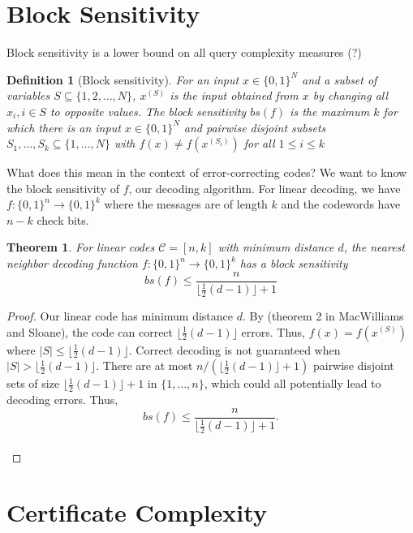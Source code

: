 \documentclass[12pt]{article}
\author{Marika Swanberg}
\newtheorem{theorem}{Theorem}
\newtheorem{definition}{Definition}
\begin{document}
\section{Block Sensitivity} 
Block sensitivity is a lower bound on all query complexity measures (?)

\begin{definition}[Block sensitivity] For an input $x\in \{0,1\}^N$ and a subset of variables $S \subseteq \{1, 2, \ldots, N\}$, $x^{(S)}$ is the input obtained from $x$ by changing all $x_i, i \in S$ to opposite values. The block sensitivity $bs(f)$ is the maximum $k$ for which there is an input $x \in \{0,1\}^N$ and pairwise disjoint subsets $S_1, \ldots, S_k \subseteq \{1, \ldots, N\}$ with $f(x) \neq f(x^{(S_i)})$ for all $1 \leq i \leq k$
\end{definition}

What does this mean in the context of error-correcting codes? We want to know the block sensitivity of $f$, our decoding algorithm. For linear decoding, we have $f: \{0,1\}^n \rightarrow \{0,1\}^k$ where the messages are of length $k$ and the codewords have $n-k$ check bits. 

\begin{theorem}
For linear codes $\mathscr{C} = [n,k]$ with minimum distance $d$, the nearest neighbor decoding function $f: \{0,1\}^n \rightarrow \{0,1\}^k$ has a block sensitivity $$
bs(f) \leq \frac{n}{\lfloor \frac{1}{2}(d-1)  \rfloor +1}$$
\end{theorem}

\begin{proof}
Our linear code has minimum distance $d$. By (theorem 2 in MacWilliams and Sloane), the code can correct $\lfloor \frac{1}{2}(d-1) \rfloor$ errors. Thus, $f(x) = f(x^{(S)})$ where $\lvert S \rvert \leq \lfloor \frac{1}{2}(d-1) \rfloor$. Correct decoding is not guaranteed when $\lvert S \rvert > \lfloor \frac{1}{2}(d-1) \rfloor$. There are at most $n/(\lfloor \frac{1}{2}(d-1) \rfloor +1)$ pairwise disjoint sets of size $\lfloor \frac{1}{2}(d-1) \rfloor+ 1$ in $\{1, \ldots, n\}$, which could all potentially lead to decoding errors. Thus, $$bs(f) \leq \frac{n}{\lfloor \frac{1}{2}(d-1)  \rfloor +1}.$$\\
\end{proof}

\section{Certificate Complexity}
\end{document}
